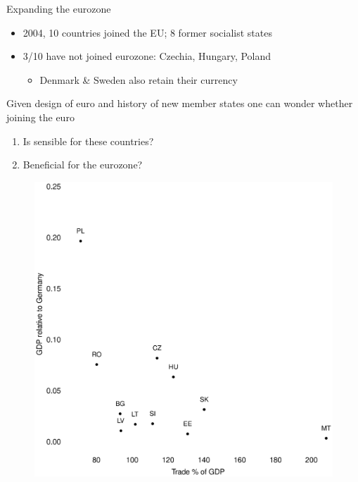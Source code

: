 \documentclass{beamer}
\begin{document}
\begin{frame}
  Expanding the eurozone
  \begin{itemize}
    \item 2004, 10 countries joined the EU; 8 former socialist states
    \item 3/10 have not joined eurozone: Czechia, Hungary, Poland
    \begin{itemize}
      \item Denmark \& Sweden also retain their currency
    \end{itemize}
  \end{itemize}
  \medskip
  Given design of euro and history of new member states one can wonder whether joining the euro
  \begin{enumerate}
    \item Is sensible for these countries?
    \item Beneficial for the eurozone?
  \end{enumerate}
\end{frame}

\begin{frame}
  \begin{figure}
    \includegraphics[scale=.3]{trade_new_members.eps}
  \end{figure}
\end{frame}
\end{document}
